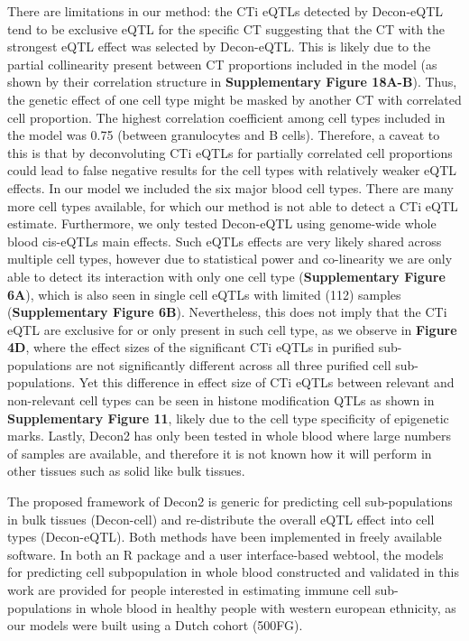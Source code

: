 There are limitations in our method: the CTi eQTLs detected by Decon-eQTL tend to be exclusive eQTL for the specific CT suggesting that the CT with the strongest eQTL effect was selected by Decon-eQTL. This is  likely due to the partial collinearity present between CT proportions included in the model (as shown by their correlation structure in \textbf{Supplementary Figure 18A-B}). Thus, the genetic effect of one cell type might be masked by another CT with correlated cell proportion. The highest correlation coefficient among cell types included in the model was 0.75 (between granulocytes and B cells). Therefore, a caveat to this is that by deconvoluting CTi eQTLs for partially correlated cell proportions could lead to false negative results for the cell types with relatively weaker eQTL effects. 
In our model we included the six major blood cell types. There are many more cell types available, for which our method is not able to detect a CTi eQTL estimate. Furthermore, we only tested Decon-eQTL using genome-wide whole blood cis-eQTLs main effects. Such eQTLs effects are very likely shared across multiple cell types, however due to statistical power and co-linearity we are only able to detect its interaction with only one cell type (\textbf{Supplementary Figure 6A}), which is also seen in single cell eQTLs with limited (112) samples (\textbf{Supplementary Figure 6B}). Nevertheless, this does not imply that the CTi eQTL are exclusive for or only present in such cell type, as we observe in \textbf{Figure 4D}, where the effect sizes of the significant CTi eQTLs in purified sub-populations are not significantly different across all three purified cell sub-populations. Yet this difference in effect size of CTi eQTLs between relevant and non-relevant cell types can be seen in histone modification QTLs as shown in \textbf{Supplementary Figure 11}, likely due to the cell type specificity of epigenetic marks. Lastly, Decon2 has only been tested in whole blood where large numbers of samples are available, and therefore it is not known how it will perform in other tissues such as solid like bulk tissues.

The proposed framework of Decon2 is generic for predicting cell sub-populations in bulk tissues (Decon-cell) and re-distribute the overall eQTL effect into cell types (Decon-eQTL). Both methods have been implemented in freely available software. In both an R package and a user interface-based webtool, the models for predicting cell subpopulation in whole blood constructed and validated in this work are provided for people interested in estimating immune cell sub-populations in whole blood in healthy people with western european ethnicity, as our models were built using a Dutch cohort (500FG). 

